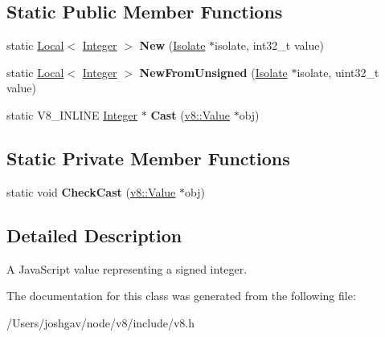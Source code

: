 \subsection*{Static Public Member Functions}
\begin{DoxyCompactItemize}
\item 
static \hyperlink{classv8_1_1_local}{Local}$<$ \hyperlink{classv8_1_1_integer}{Integer} $>$ {\bfseries New} (\hyperlink{classv8_1_1_isolate}{Isolate} $\ast$isolate, int32\+\_\+t value)\hypertarget{classv8_1_1_integer_a730d6e093c16d95edb5b92a4d05773d0}{}\label{classv8_1_1_integer_a730d6e093c16d95edb5b92a4d05773d0}

\item 
static \hyperlink{classv8_1_1_local}{Local}$<$ \hyperlink{classv8_1_1_integer}{Integer} $>$ {\bfseries New\+From\+Unsigned} (\hyperlink{classv8_1_1_isolate}{Isolate} $\ast$isolate, uint32\+\_\+t value)\hypertarget{classv8_1_1_integer_a6fbd6e79db802c737cb0bd5a259f134b}{}\label{classv8_1_1_integer_a6fbd6e79db802c737cb0bd5a259f134b}

\item 
static V8\+\_\+\+I\+N\+L\+I\+NE \hyperlink{classv8_1_1_integer}{Integer} $\ast$ {\bfseries Cast} (\hyperlink{classv8_1_1_value}{v8\+::\+Value} $\ast$obj)\hypertarget{classv8_1_1_integer_a886f73d3d8bb91f8235f66d8dccec12a}{}\label{classv8_1_1_integer_a886f73d3d8bb91f8235f66d8dccec12a}

\end{DoxyCompactItemize}
\subsection*{Static Private Member Functions}
\begin{DoxyCompactItemize}
\item 
static void {\bfseries Check\+Cast} (\hyperlink{classv8_1_1_value}{v8\+::\+Value} $\ast$obj)\hypertarget{classv8_1_1_integer_acc356589ec9cdb5a1dd232ed80e13a74}{}\label{classv8_1_1_integer_acc356589ec9cdb5a1dd232ed80e13a74}

\end{DoxyCompactItemize}


\subsection{Detailed Description}
A Java\+Script value representing a signed integer. 

The documentation for this class was generated from the following file\+:\begin{DoxyCompactItemize}
\item 
/\+Users/joshgav/node/v8/include/v8.\+h\end{DoxyCompactItemize}
